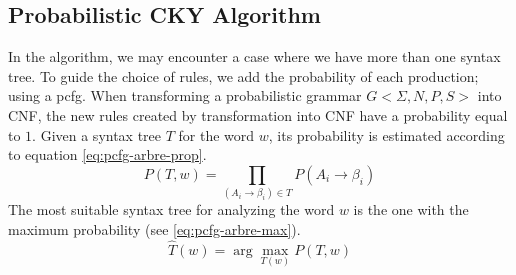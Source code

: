 \documentclass{KodeBook}
\begin{document}
\subsection{Probabilistic CKY Algorithm}

In the  algorithm, we may encounter a case where we have more than one syntax tree.
To guide the choice of rules, we add the probability of each production; using a \ac{pcfg}.
When transforming a probabilistic grammar $G<\Sigma, N, P, S>$ into CNF, the new rules created by transformation into CNF have a probability equal to $1$.
Given a syntax tree $T$ for the word $w$, its probability is estimated according to equation \ref{eq:pcfg-arbre-prop}.
\begin{equation}
	P(T, w) = \prod\limits_{(A_i \rightarrow \beta_i) \in T} P(A_i \rightarrow \beta_i)
	\label{eq:pcfg-arbre-prop}
\end{equation}
The most suitable syntax tree for analyzing the word $w$ is the one with the maximum probability (see \ref{eq:pcfg-arbre-max}).
\begin{equation}
	\hat{T}(w) = \arg\max\limits_{T(w)} P(T, w)
	\label{eq:pcfg-arbre-max}
\end{equation}
\end{document}
